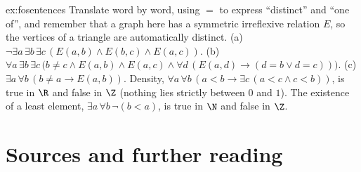 \begin{solution}{ex:fosentences}
\idea Translate word by word, using $=$ to express ``distinct'' and ``one of'', and remember that a graph here has a symmetric
irreflexive relation $E$, so the vertices of a triangle are automatically distinct.
\writeup (a) $\neg\exists a\,\exists b\,\exists c\,(E(a,b)\land E(b,c)\land E(a,c))$. (b) $\forall a\,\exists b\,\exists c\,\bigl(b\ne c\land E(a,b)\land E(a,c)\land\forall d\,(E(a,d)\to(d=b\lor d=c))\bigr)$.
(c) $\exists a\,\forall b\,(b\ne a\to E(a,b))$. Density, $\forall a\,\forall b\,(a<b\to\exists c\,(a<c\land c<b))$, is true in $\R$ and false in $\Z$ (nothing
lies strictly between $0$ and $1$). The existence of a least element, $\exists a\,\forall b\,\neg(b<a)$, is true in $\N$ and false in $\Z$.
\end{solution}

\section*{Sources and further reading}


